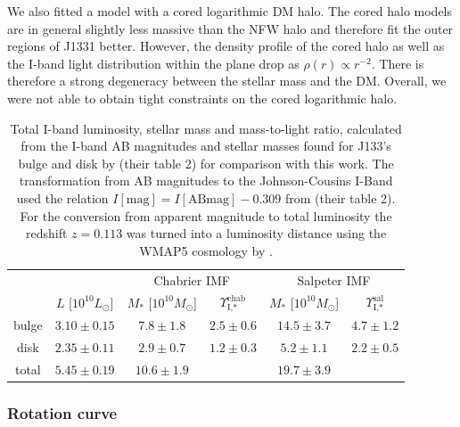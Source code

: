 \documentclass[useAMS,usenatbib]{mnras}
\begin{document}
We also fitted a model with a cored logarithmic DM halo. The cored halo models are in general slightly less massive than the NFW halo and therefore fit the outer regions of J1331 better. However, the density profile of the cored halo as well as the I-band light distribution within the plane drop as $\rho(r) \propto r^{-2}$. There is therefore a strong degeneracy between the stellar mass and the DM. Overall, we were not able to obtain tight constraints on the cored logarithmic halo.

\begin{table}
\centering
\caption{Total I-band luminosity, stellar mass and mass-to-light ratio, calculated from the I-band AB magnitudes and stellar masses found for J133's bulge and disk by \citet{SWELLSI} (their table 2) for comparison with this work. The transformation from AB magnitudes to the Johnson-Cousins I-Band used the relation $I[\text{mag}] = I[\text{ABmag}] - 0.309$ from \citet{FG1994} (their table 2). For the conversion from apparent magnitude to total luminosity the redshift $z=0.113$ \citet{SWELLSIII} was turned into a luminosity distance using the WMAP5 cosmology by \citet{WMAP5cosm}. }
\begin{tabular}{cccccc}
\hline\hline
& & \multicolumn{2}{c}{Chabrier IMF} & \multicolumn{2}{c}{Salpeter IMF}\\
      &  $L$ [$10^{10}L_{\odot}$]                & $M_*$ [$10^{10}M_\odot$]               & $\Upsilon_\text{I,*}^\text{chab}$ & $M_*$ [$10^{10}M_\odot$] & $\Upsilon_\text{I,*}^\text{sal}$ \\\hline
bulge &   $3.10 \pm 0.15 $  & $7.8 \pm 1.8$ & $2.5 \pm 0.6$ & $14.5 \pm 3.7 $ & $4.7 \pm 1.2$ \\
disk  &   $2.35 \pm 0.11 $  & $2.9 \pm 0.7$ & $1.2 \pm 0.3$ & $5.2 \pm 1.1$ & $2.2 \pm 0.5$ \\
total &   $5.45 \pm 0.19$ & $10.6 \pm 1.9$& & $19.7 \pm 3.9$&\\\hline
\end{tabular}
\label{tab:previousresults}
\end{table}

\subsubsection{Rotation curve}
\end{document}
